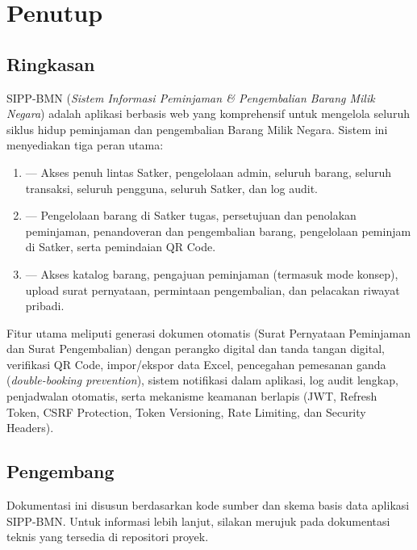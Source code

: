 \documentclass[
  12pt,
  a4paper,
  oneside,
  final
]{report}
\begin{document}
\chapter{Penutup}

\section{Ringkasan}

SIPP-BMN ({\it Sistem Informasi Peminjaman \& Pengembalian Barang
Milik Negara}) adalah aplikasi berbasis web yang komprehensif
untuk mengelola seluruh siklus hidup peminjaman dan pengembalian
Barang Milik Negara. Sistem ini menyediakan tiga peran utama:

\begin{enumerate}
  \item {\roleSuperAdmin} --- Akses penuh lintas Satker,
        pengelolaan admin, seluruh barang, seluruh transaksi,
        seluruh pengguna, seluruh Satker, dan log audit.

  \item {\roleAdmin} --- Pengelolaan barang di Satker tugas,
        persetujuan dan penolakan peminjaman, penandoveran
        dan pengembalian barang, pengelolaan peminjam di Satker,
        serta pemindaian QR Code.

  \item {\rolePeminjam} --- Akses katalog barang, pengajuan
        peminjaman (termasuk mode konsep), upload surat
        pernyataan, permintaan pengembalian, dan pelacakan
        riwayat pribadi.
\end{enumerate}

Fitur utama meliputi generasi dokumen otomatis (Surat Pernyataan
Peminjaman dan Surat Pengembalian) dengan perangko digital dan
tanda tangan digital, verifikasi QR Code, impor/ekspor data Excel,
pencegahan pemesanan ganda ({\it double-booking prevention}),
sistem notifikasi dalam aplikasi, log audit lengkap, penjadwalan
otomatis, serta mekanisme keamanan berlapis (JWT, Refresh Token,
CSRF Protection, Token Versioning, Rate Limiting, dan Security
Headers).

\section{Pengembang}

Dokumentasi ini disusun berdasarkan kode sumber dan skema
basis data aplikasi SIPP-BMN. Untuk informasi lebih lanjut,
silakan merujuk pada dokumentasi teknis yang tersedia di
repositori proyek.
\end{document}
